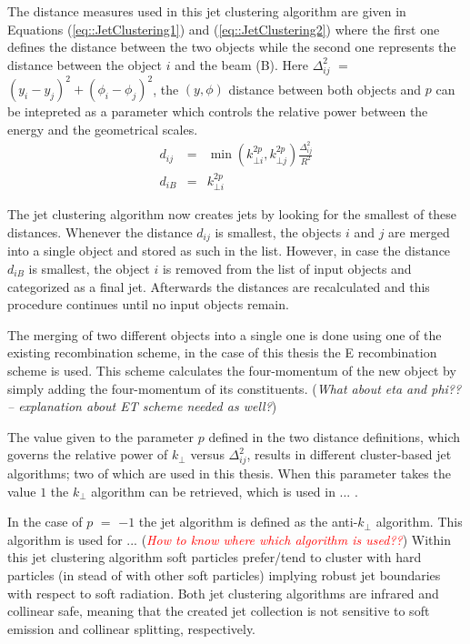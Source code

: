 The distance measures used in this jet clustering algorithm are given in Equations (\ref{eq::JetClustering1}) and (\ref{eq::JetClustering2}) where the first one defines the distance between the two objects while the second one represents the distance between the object $i$ and the beam (B). Here $\Delta_{ij}^{2}$ $=$ $(y_i - y_j)^{2} + (\phi_i - \phi_j)^2$, the $(y,\phi)$ distance between both objects and $p$ can be intepreted as a parameter which controls the relative power between the energy and the geometrical scales.
\begin{eqnarray}
 d_{ij} & = & \min(k_{\bot i}^{2p}, k_{\bot j}^{2p}) \frac{\Delta_{ij}^{2}}{R^{2}} \label{eq::JetClustering1} \\
 d_{iB} & = & k_{\bot i}^{2p}                                                      \label{eq::JetClustering2}
\end{eqnarray}

The jet clustering algorithm now creates jets by looking for the smallest of these distances. Whenever the distance $d_{ij}$ is smallest, the objects $i$ and $j$ are merged into a single object and stored as such in the list. However, in case the distance $d_{iB}$ is smallest, the object $i$ is removed from the list of input objects and categorized as a final jet. Afterwards the distances are recalculated and this procedure continues until no input objects remain.

The merging of two different objects into a single one is done using one of the existing recombination scheme, in the case of this thesis the E recombination scheme is used. This scheme calculates the four-momentum of the new object by simply adding the four-momentum of its constituents. (\textit{What about eta and phi?? -- explanation about ET scheme needed as well?})

The value given to the parameter $p$ defined in the two distance definitions, which governs the relative power of $k_{\bot}$ versus $\Delta_{ij}^{2}$, results in different cluster-based jet algorithms; two of which are used in this thesis. When this parameter takes the value $1$ the $k_{\bot}$ algorithm can be retrieved, which is used in ... . 

In the case of $p$ $=$ $-1$ the jet algorithm is defined as the anti-$k_{\bot}$ algorithm. This algorithm is used for ... (\textit{\textcolor{red}{How to know where which algorithm is used??}})
Within this jet clustering algorithm soft particles prefer/tend to cluster with hard particles (in stead of with other soft particles) implying robust jet boundaries with respect to soft radiation. Both jet clustering algorithms are infrared and collinear safe, meaning that the created jet collection is not sensitive to soft emission and collinear splitting, respectively.

